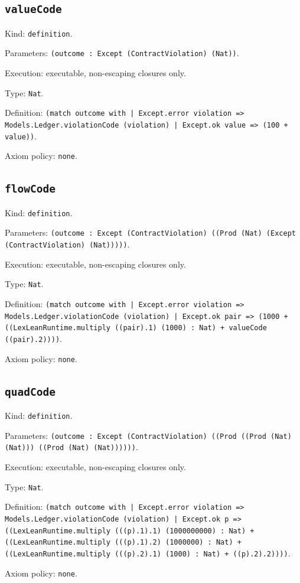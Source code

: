 \documentclass[11pt]{article}
\begin{document}
\subsection*{\texttt{valueCode}}
\noindent Kind: \texttt{definition}.\par
\noindent Parameters: \texttt{(outcome : Except (ContractViolation) (Nat))}.\par
\noindent Execution: executable, non-escaping closures only.\par
\noindent Type: \texttt{Nat}.\par
\noindent Definition: \texttt{(match outcome with | Except.error violation => Models.Ledger.violationCode (violation) | Except.ok value => (100 + value))}.\par
\noindent Axiom policy: \texttt{none}.\par
\subsection*{\texttt{flowCode}}
\noindent Kind: \texttt{definition}.\par
\noindent Parameters: \texttt{(outcome : Except (ContractViolation) ((Prod (Nat) (Except (ContractViolation) (Nat)))))}.\par
\noindent Execution: executable, non-escaping closures only.\par
\noindent Type: \texttt{Nat}.\par
\noindent Definition: \texttt{(match outcome with | Except.error violation => Models.Ledger.violationCode (violation) | Except.ok pair => (1000 + ((LexLeanRuntime.multiply ((pair).1) (1000) : Nat) + valueCode ((pair).2))))}.\par
\noindent Axiom policy: \texttt{none}.\par
\subsection*{\texttt{quadCode}}
\noindent Kind: \texttt{definition}.\par
\noindent Parameters: \texttt{(outcome : Except (ContractViolation) ((Prod ((Prod (Nat) (Nat))) ((Prod (Nat) (Nat))))))}.\par
\noindent Execution: executable, non-escaping closures only.\par
\noindent Type: \texttt{Nat}.\par
\noindent Definition: \texttt{(match outcome with | Except.error violation => Models.Ledger.violationCode (violation) | Except.ok p => ((LexLeanRuntime.multiply (((p).1).1) (1000000000) : Nat) + ((LexLeanRuntime.multiply (((p).1).2) (1000000) : Nat) + ((LexLeanRuntime.multiply (((p).2).1) (1000) : Nat) + ((p).2).2))))}.\par
\noindent Axiom policy: \texttt{none}.\par
\end{document}
